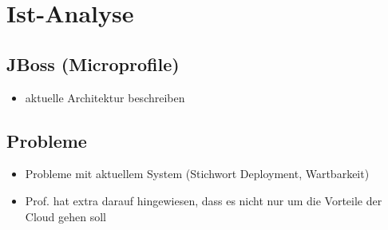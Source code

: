 \chapter{Ist-Analyse}

\section{JBoss (Microprofile)}
\begin{itemize}
  \item aktuelle Architektur beschreiben
\end{itemize}

\section{Probleme}
\begin{itemize}
  \item Probleme mit aktuellem System (Stichwort Deployment, Wartbarkeit)
  \item Prof. hat extra darauf hingewiesen, dass es nicht nur um die Vorteile der Cloud gehen soll
\end{itemize}
